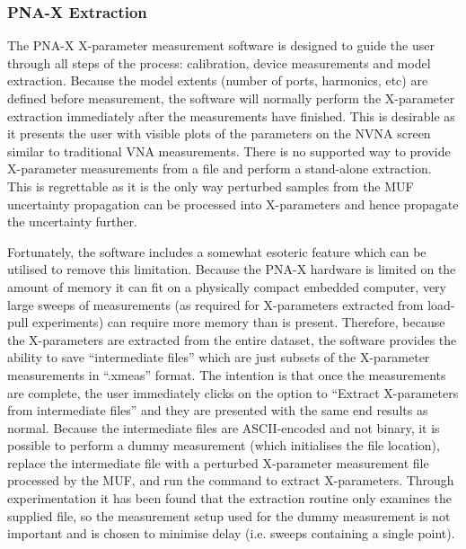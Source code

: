 \documentclass[../thesis/thesis.tex]{subfiles}
\begin{document}
\subsubsection{PNA-X Extraction}

The PNA-X X-parameter measurement software is designed to guide the user through all steps of the process: calibration, device measurements and model extraction. Because the model extents (number of ports, harmonics, etc) are defined before measurement, the software will normally perform the X-parameter extraction immediately after the measurements have finished. This is desirable as it presents the user with visible plots of the parameters on the NVNA screen similar to traditional VNA measurements. There is no supported way to provide X-parameter measurements from a file and perform a stand-alone extraction. This is regrettable as it is the only way perturbed samples from the MUF uncertainty propagation can be processed into X-parameters and hence propagate the uncertainty further.

Fortunately, the software includes a somewhat esoteric feature which can be utilised to remove this limitation. Because the PNA-X hardware is limited on the amount of memory it can fit on a physically compact embedded computer, very large sweeps of measurements (as required for X-parameters extracted from load-pull experiments) can require more memory than is present. Therefore, because the X-parameters are extracted from the entire dataset, the software provides the ability to save ``intermediate files''  which are just subsets of the X-parameter measurements in ``.xmeas'' format.  The intention is that once the measurements are complete, the user immediately clicks on the option to ``Extract X-parameters from intermediate files'' and they are presented with the same end results as normal. Because the intermediate files are ASCII-encoded and not binary, it is possible to perform a dummy measurement (which initialises the file location), replace the intermediate file with a perturbed X-parameter measurement file processed by the MUF, and run the command to extract X-parameters. Through experimentation it has been found that the extraction routine only examines the supplied file, so the measurement setup used for the dummy measurement is not important and is chosen to minimise delay (i.e. sweeps containing a single point).
\end{document}
